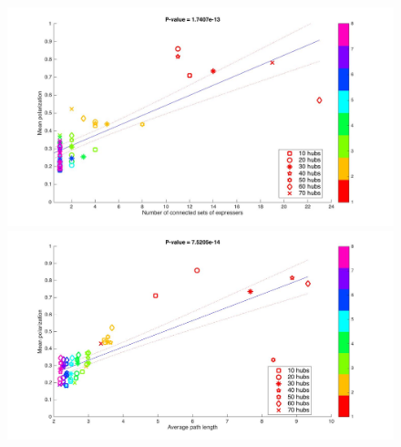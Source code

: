 \documentclass{article}
\begin{document}
\begin{figure}
\hspace{-1.5cm}
\includegraphics[scale=0.20]{img/reg3.jpg}
\hspace{-1.2cm} 
\includegraphics[scale=0.20]{img/reg5.jpg}
\caption{}
\label{reg2}
\end{figure}
\end{document}
